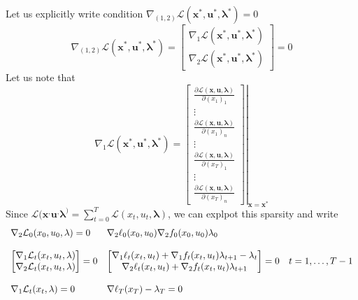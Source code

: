 \documentclass{book}
\newcommand\at[2]{\left.#1\right|_{#2}}
\theoremstyle{definition}
\theoremstyle{remark}
\theoremstyle{remark}
\begin{document}
Let us explicitly write condition $\nabla_{(1,2)} \mathcal{L}(\mathbf{x}^*,\mathbf{u}^*,\mathbf{\lambda}^*) = 0 $ 
\[
    \nabla_{(1,2)} \mathcal{L}(\mathbf{x}^*,\mathbf{u}^*,\mathbf{\lambda}^*) = \begin{bmatrix}
        \nabla_1\mathcal{L}(\mathbf{x}^*,\mathbf{u}^*,\mathbf{\lambda}^*)\\
        \nabla_2\mathcal{L}(\mathbf{x}^*,\mathbf{u}^*,\mathbf{\lambda}^*)
    \end{bmatrix} = 0
\]
Let us note that 
\[
    \nabla_1\mathcal{L}(\mathbf{x}^*,\mathbf{u}^*,\mathbf{\lambda}^*) = \at{\begin{bmatrix}
            \displaystyle\frac{\partial \mathcal{L}(\mathbf{x},\mathbf{u},\mathbf{\lambda})}{\partial (x_1)_1}\\
            \vdots \\
            \displaystyle\frac{\partial \mathcal{L}(\mathbf{x},\mathbf{u},\mathbf{\lambda})}{\partial (x_1)_n}\\
            \vdots \\
            \displaystyle\frac{\partial \mathcal{L}(\mathbf{x},\mathbf{u},\mathbf{\lambda})}{\partial (x_T)_1}\\
            \vdots \\
            \displaystyle\frac{\partial \mathcal{L}(\mathbf{x},\mathbf{u},\mathbf{\lambda})}{\partial (x_T)_n}
    \end{bmatrix}}{\mathbf{x}=\mathbf{x}^*}
\]
Since $\mathcal{L}(\mathbf{x}^,\mathbf{u}^,\mathbf{\lambda}^)= \displaystyle\sum_{t=0}^{T}\mathcal{L}(x_t,u_t,\mathbf{\lambda})$, we can explpot this sparsity and write 
\[
    \begin{array}{l l}
        \nabla_2\mathcal{L}_0(x_0,u_0,\mathbf{\lambda}) = 0 & \nabla_2\ell_0(x_0,u_0)\nabla_2f_0(x_0,u_0)\lambda_0\\
                                                            & \\
                                                            \begin{bmatrix}
                                                                \nabla_1\mathcal{L}_t(x_t,u_t,\mathbf{\lambda})\\
                                                                \nabla_2\mathcal{L}_t(x_t,u_t,\mathbf{\lambda})
                                                            \end{bmatrix} = 0 &  
                                                            \begin{bmatrix}
                                                                \nabla_1\ell_t(x_t,u_t) + \nabla_1f_t(x_t,u_t)\lambda_{t+1}-\lambda_t \\
                                                                \nabla_2\ell_t(x_t,u_t) + \nabla_2f_t(x_t,u_t)\lambda_{t+1}
                                                            \end{bmatrix} = 0 \quad t=1,\dots,T-1 \\
                                                            & \\
        \nabla_1\mathcal{L}_t(x_t,\mathbf{\lambda}) = 0 & \nabla\ell_T(x_T)-\lambda_T = 0
    \end{array}
\]
\end{document}
